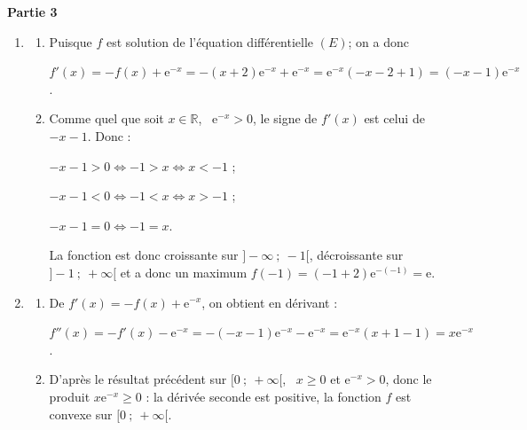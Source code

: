 \documentclass[10pt]{article}
\providecommand{\R}{\mathbb{R}}
\begin{document}
\bigskip

\begin{center}\textbf{Partie 3}\end{center}



\medskip

\begin{enumerate}
\item 
	\begin{enumerate}
		\item 
Puisque $f$ est solution de l'équation différentielle $(E)$; on a donc 
		
$f'(x) = - f(x) + \text{e}^{-x} = -(x+2)\text{e}^{-x} + \text{e}^{-x} = \text{e}^{-x}(- x - 2 + 1) = (- x - 1)\text{e}^{-x}$.
		\item 




Comme quel que soit $x \in \R$, \, $\text{e}^{-x} > 0$, le signe de $f'(x)$ est celui de $- x - 1$. Donc :

$- x - 1 > 0 \iff - 1 > x \iff x < - 1$ ; 

$- x - 1 < 0 \iff - 1 < x \iff x > - 1$ ;

$- x - 1 = 0 \iff - 1 = x $.

La fonction est donc croissante sur $]- \infty~;~-1[$, décroissante sur $]- 1~;~+ \infty[$ et a donc un maximum $f(- 1) = (- 1 + 2)\text{e}^{-(-1)} = \text{e}$.
	\end{enumerate}
\item 
	\begin{enumerate}
		\item 
		De $f'(x) = -f(x) + \text{e}^{-x}$, on obtient en dérivant :
		
		$f''(x) = - f'(x) - \text{e}^{-x} = - (- x - 1)\text{e}^{-x} - \text{e}^{-x} = \text{e}^{-x}(x + 1 - 1) = x\text{e}^{-x}$.
		\item 
D'après le résultat précédent sur $[0~;~+\infty[$, \, $x \geqslant  0$ et $\text{e}^{-x} > 0$, donc le produit $x \text{e}^{-x} \geqslant 0$ : la dérivée seconde est positive, la fonction $f$ est convexe sur $[0~;~+\infty[$.
	\end{enumerate}
\end{enumerate}

\bigskip
\end{document}
